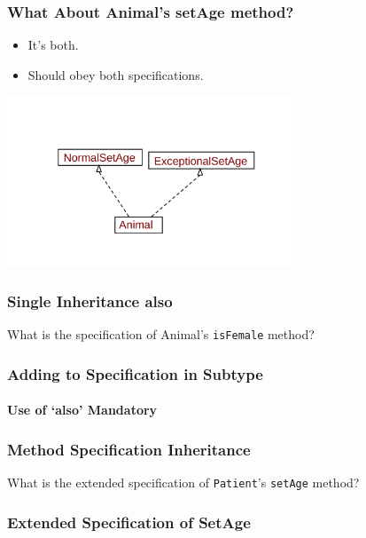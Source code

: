 \begin{frame}
\frametitle{What About Animal's setAge method?}

\begin{itemize}
\item
It's both.

\item
Should \alert{obey both specifications}.
\end{itemize}
\includegraphics[height=2in]{multiple-inh2}
\end{frame}

\begin{frame}[fragile]
\frametitle{Single Inheritance also}
\begin{question}
What is the specification of Animal's \texttt{isFemale} method?

\rm



\end{question}
\end{frame}

\begin{frame}[fragile]
\frametitle{Adding to Specification in Subtype}
\framesubtitle{Use of `also' Mandatory}


\end{frame}

\begin{frame}
\frametitle{Method Specification Inheritance}

\begin{question}
What is the extended specification of \texttt{Patient}'s
\texttt{setAge} method?
\end{question}
\end{frame}

\begin{frame}[fragile]
\frametitle{Extended Specification of SetAge}


\end{frame}

